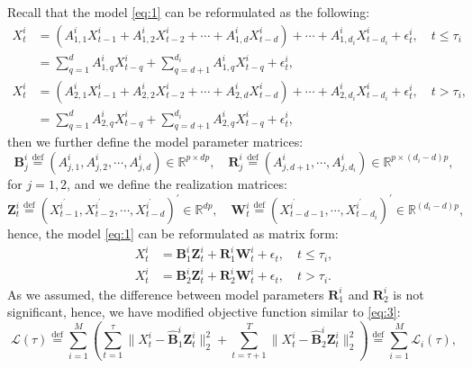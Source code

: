 \documentclass[11pt]{article}
\begin{document}
Recall that the model \eqref{eq:1} can be reformulated as the following:
\begin{equation*}
    \begin{aligned}
        X_t^i &= \left(A_{1,1}^iX_{t-1}^i + A_{1,2}^i X_{t-2}^i + \cdots + A_{1,d}^iX_{t-d}^i\right) + \cdots + A_{1,d_i}^iX_{t-d_i}^i + \epsilon_t^i, \quad t\leq \tau_i \\
        &= \sum_{q=1}^d A_{1,q}^iX_{t-q}^i + \sum_{q=d+1}^{d_i}A_{1,q}^iX_{t-q}^i + \epsilon_t^i, \\
        X_t^i &= \left(A_{2,1}^iX_{t-1}^i + A_{2,2}^i X_{t-2}^i + \cdots + A_{2,d}^iX_{t-d}^i\right) + \cdots + A_{2,d_i}^i X_{t-d_i}^i + \epsilon_t^i,\quad t > \tau_i, \\
        &= \sum_{q=1}^d A_{2,q}^iX_{t-q}^i + \sum_{q=d+1}^{d_i}A_{2,q}^iX_{t-q}^i + \epsilon_t^i,
    \end{aligned}
\end{equation*}
then we further define the model parameter matrices:
\begin{equation*}
    \mathbf{B}_{j}^i \overset{\text{def}}{=} \left(A_{j,1}^i, A_{j,2}^i, \cdots, A_{j,d}^i\right) \in \mathbb{R}^{p \times dp},\quad \mathbf{R}_j^i \overset{\text{def}}{=} \left( A_{j,d+1}^i, \cdots, A_{j,d_i}^i \right) \in \mathbb{R}^{p \times (d_i-d)p},
\end{equation*}
for $j=1,2$, and we define the realization matrices:
\begin{equation*}
    \mathbf{Z}_t^i \overset{\text{def}}{=} \left(X_{t-1}^{i^\prime}, X_{t-2}^{i^\prime}, \cdots, X_{t-d}^{i^\prime}\right)^\prime \in \mathbb{R}^{dp},\quad \mathbf{W}_t^i \overset{\text{def}}{=} \left(X_{t-d-1}^{i^\prime}, \cdots, X_{t-d_i}^{i^\prime}\right)^\prime \in \mathbb{R}^{(d_i-d)p},
\end{equation*}
hence, the model \eqref{eq:1} can be reformulated as matrix form:
\begin{equation*}
    \begin{aligned}
        X_t^i &= \mathbf{B}_1^i\mathbf{Z}_t^i + \mathbf{R}_1^i\mathbf{W}_t^i + \epsilon_t, \quad t \leq \tau_i, \\
        X_t^i &= \mathbf{B}_2^i\mathbf{Z}_t^i + \mathbf{R}_2^i\mathbf{W}_t^i + \epsilon_t, \quad t > \tau_i.
    \end{aligned}
\end{equation*}
As we assumed, the difference between model parameters $\mathbf{R}_1^i$ and $\mathbf{R}_2^i$ is not significant, hence, we have modified objective function similar to \eqref{eq:3}:
\begin{equation*}
    \mathcal{L}(\tau) \overset{\text{def}}{=} \sum_{i=1}^M\left( \sum_{t=1}^\tau\|X_t^i - \widehat{\mathbf{B}}_1^i\mathbf{Z}_t^i\|_2^2 + \sum_{t=\tau+1}^T\|X_t^i - \widehat{\mathbf{B}}^i_2\mathbf{Z}_t^i\|_2^2 \right) \overset{\text{def}}{=} \sum_{i=1}^M\mathcal{L}_i(\tau),
\end{equation*}
\end{document}
